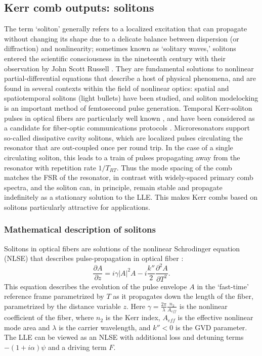 \subsection{Kerr comb outputs: solitons} \label{sec:LLEsolitons}
The term `soliton' generally refers to a localized excitation that can propagate without changing its shape due to a delicate balance between dispersion (or diffraction) and nonlinearity; sometimes known as `solitary waves,' solitons entered the scientific consciousness in the nineteenth century with their observation by John Scott Russell \cite{Russell1844}. They are fundamental solutions to nonlinear partial-differential equations that describe a host of physical phenomena, and are found in several contexts within the field of nonlinear optics: spatial\cite{Lugiato1987,Brambilla1997} and spatiotemporal solitons (light bullets) \cite{Minardi2010} have been studied, and soliton modelocking \cite{Kartner1996,Grelu2012} is an important method of femtosecond pulse generation. Temporal Kerr-soliton pulses in optical fibers are particularly well known \cite{Agrawal2007,Mollenauer2006}, and have been considered as a candidate for fiber-optic communications protocols \cite{Hasegawa1995,Haus1996}. Microresonators support so-called dissipative cavity solitons, which are localized pulses circulating the resonator that are out-coupled once per round trip. In the case of a single circulating soliton, this leads to a train of pulses propagating away from the resonator with repetition rate $1/T_{RT}$. Thus the mode spacing of the comb matches the FSR of the resonator, in contrast with widely-spaced primary comb spectra, and the soliton can, in principle, remain stable and propagate indefinitely as a stationary solution to the LLE. This makes Kerr combs based on solitons particularly attractive for applications.

\subsubsection{Mathematical description of solitons}
\label{sec:solitonmath}

Solitons in optical fibers are solutions of the nonlinear Schrodinger equation (NLSE) that describes pulse-propagation in optical fiber \cite{Agrawal2007}:
\begin{equation}
\frac{\partial A}{\partial z}= i\gamma|A|^2 A -i \frac{k''}{2} \frac{\partial^2 A}{\partial T^2}. \label{NLSE}
\end{equation}
This equation describes the evolution of the pulse envelope $A$ in the `fast-time' reference frame parametrized by $T$ as it propagates down the length of the fiber, parametrized by the distance variable $z$. Here $\gamma=\frac{2\pi}{\lambda}\frac{n_2}{A_{eff}}$ is the nonlinear coefficient of the fiber, where $n_2$ is the Kerr index, $A_{eff}$ is the effective nonlinear mode area and $\lambda$ is the carrier wavelength, and $k''<0$ is the GVD parameter. The LLE can be viewed as an NLSE with additional loss and detuning terms $-(1+i\alpha)\psi$ and a driving term $F$.

